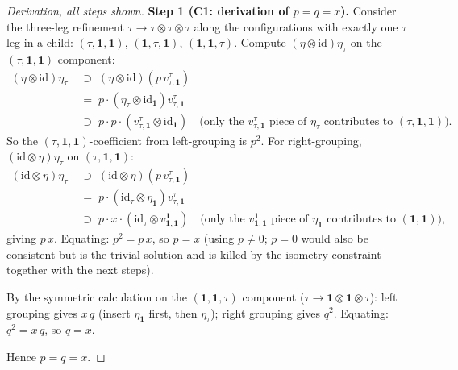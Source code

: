 \documentclass[11pt,a4paper]{article}
\theoremstyle{definition}
\newcommand{\id}{\mathrm{id}}
\newcommand{\one}{\mathbf{1}}
\begin{document}
\begin{proof}[Derivation, all steps shown]
\textbf{Step 1 (C1: derivation of $p = q = x$).}
Consider the three-leg refinement $\tau \to \tau\otimes\tau\otimes\tau$
along the configurations with exactly one $\tau$ leg in a child:
$(\tau,\one,\one)$, $(\one,\tau,\one)$, $(\one,\one,\tau)$. Compute
$(\eta\otimes\id)\eta_\tau$ on the $(\tau,\one,\one)$ component:
\begin{align*}
(\eta\otimes\id)\eta_\tau
&\;\supset\; (\eta\otimes\id)(p\,v^{\tau}_{\tau,\one}) \\
&\;=\; p\cdot (\eta_\tau \otimes \id_\one) v^{\tau}_{\tau,\one} \\
&\;\supset\; p\cdot p\cdot (v^{\tau}_{\tau,\one}\otimes \id_\one)
   \quad\text{(only the } v^{\tau}_{\tau,\one}\text{ piece of }\eta_\tau\text{ contributes to }(\tau,\one,\one)\text{)}.
\end{align*}
So the $(\tau,\one,\one)$-coefficient from left-grouping is $p^{2}$.
For right-grouping, $(\id\otimes\eta)\eta_\tau$ on $(\tau,\one,\one)$:
\begin{align*}
(\id\otimes\eta)\eta_\tau
&\;\supset\; (\id\otimes\eta)(p\,v^{\tau}_{\tau,\one}) \\
&\;=\; p\cdot (\id_\tau\otimes \eta_\one)v^{\tau}_{\tau,\one} \\
&\;\supset\; p\cdot x \cdot (\id_\tau \otimes v^{\one}_{\one,\one})
   \quad\text{(only the } v^{\one}_{\one,\one}\text{ piece of }\eta_\one\text{ contributes to }(\one,\one)\text{)},
\end{align*}
giving $p\,x$. Equating: $p^{2} = p\,x$, so $p = x$ (using $p\ne 0$;
$p=0$ would also be consistent but is the trivial solution and is killed by
the isometry constraint together with the next steps).

By the symmetric calculation on the $(\one,\one,\tau)$ component
($\tau \to \one\otimes\one\otimes\tau$): left grouping gives
$x\,q$ (insert $\eta_\one$ first, then $\eta_\tau$); right grouping gives
$q^{2}$. Equating: $q^{2} = x\,q$, so $q = x$.

Hence $p = q = x$.


\end{proof}
\end{document}
